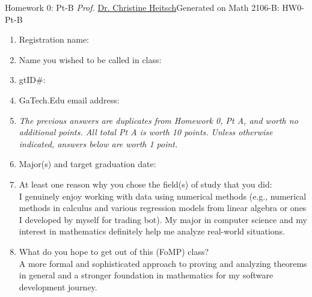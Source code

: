 \newpage{}
{Homework 0: Pt-B}
{\textit{Prof.} \href{https://ceheitsch.github.io/webpage/}{Dr. Christine Heitsch}}{Generated on \generatedOn}
{Math 2106-B: HW0-Pt-B}

% 






\begin{enumerate}[label=\arabic*.]
  \item Registration name:
  
  \item Name you wished to be called in class:
  
  \item gtID\#:
  
  \item GaTech.Edu email address: \\ 

  \item \textit{The previous answers are duplicates from Homework 0, Pt A, and 
  worth no additional points. 
  All total Pt A is worth 10 points.
  Unless otherwise indicated, answers below are worth 1 point.} \\
  
  \item Major(s) and target graduation date:

  \item At least one reason why you chose the field(s) of study that you did:\\
  {\color{bluecolor}I genuinely enjoy working with data using numerical methods 
  (e.g., numerical methods in calculus and various regression models from 
  linear algebra or ones I developed by myself for trading bot). 
  My major in computer science and 
  my interest in mathematics definitely help me analyze real-world situations.}\\

  \item What do you hope to get out of this (FoMP) class?\\
  {\color{bluecolor}A more formal and sophisticated approach to 
  proving and analyzing theorems in general and a stronger foundation 
  in mathematics for my software development journey.}\\
  

\end{enumerate}
